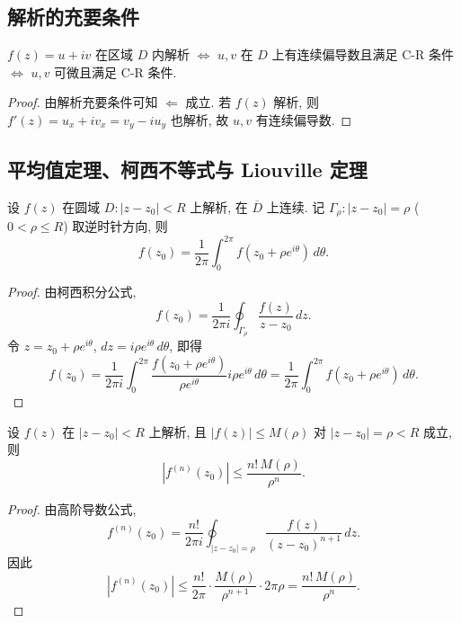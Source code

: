 \documentclass[theorem=false,mathfont=none,openany,sub3section]{easybook}
\begin{document}
\subsection{解析的充要条件}

\begin{theorem}
  $f(z)=u+iv$ 在区域 $D$ 内解析 $\Leftrightarrow$ $u,v$ 在 $D$ 上有连续偏导数且满足 C-R 条件 $\Leftrightarrow$ $u,v$ 可微且满足 C-R 条件.
\end{theorem}

\begin{proof}
  由解析充要条件可知 $\Leftarrow$ 成立.
  若 $f(z)$ 解析, 则 $f'(z)=u_{x}+iv_{x}=v_{y}-iu_{y}$ 也解析, 故 $u,v$ 有连续偏导数.
\end{proof}

\subsection{平均值定理、柯西不等式与 Liouville 定理}

\begin{theorem}[平均值定理]
  设 $f(z)$ 在圆域 $D:|z-z_{0}|<R$ 上解析, 在 $\overline{D}$ 上连续. 记 $\Gamma_{\rho}:|z-z_{0}|=\rho$ ($0<\rho\leq R$) 取逆时针方向, 则
  \[
  f(z_{0})=\frac{1}{2\pi}\int_{0}^{2\pi}f(z_{0}+\rho e^{i\theta})\,d\theta.
  \]
\end{theorem}

\begin{proof}
  由柯西积分公式,
  \[
  f(z_{0})=\frac{1}{2\pi i}\oint_{\Gamma_{\rho}}\frac{f(z)}{z-z_{0}}\,dz.
  \]
  令 $z=z_{0}+\rho e^{i\theta}$, $dz=i\rho e^{i\theta}\,d\theta$, 即得
  \[
  f(z_{0})=\frac{1}{2\pi i}\int_{0}^{2\pi}\frac{f(z_{0}+\rho e^{i\theta})}{\rho e^{i\theta}}i\rho e^{i\theta}\,d\theta
  =\frac{1}{2\pi}\int_{0}^{2\pi}f(z_{0}+\rho e^{i\theta})\,d\theta.
  \]
\end{proof}

\begin{theorem}[柯西不等式]
  设 $f(z)$ 在 $|z-z_{0}|<R$ 上解析, 且 $|f(z)|\leq M(\rho)$ 对 $|z-z_{0}|=\rho<R$ 成立, 则
  \[
  |f^{(n)}(z_{0})|\leq\frac{n!\,M(\rho)}{\rho^{n}}.
  \]
\end{theorem}

\begin{proof}
  由高阶导数公式,
  \[
  f^{(n)}(z_{0})=\frac{n!}{2\pi i}\oint_{|z-z_{0}|=\rho}\frac{f(z)}{(z-z_{0})^{n+1}}\,dz.
  \]
  因此
  \[
  |f^{(n)}(z_{0})|\leq\frac{n!}{2\pi}\cdot\frac{M(\rho)}{\rho^{n+1}}\cdot 2\pi\rho
  =\frac{n!\,M(\rho)}{\rho^{n}}.
  \]
\end{proof}
\end{document}
